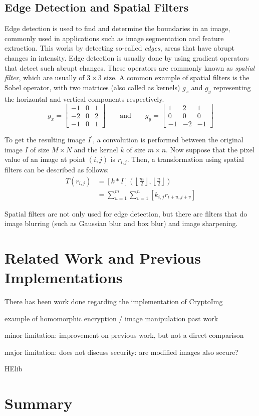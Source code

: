 \subsection{Edge Detection and Spatial Filters}
Edge detection is used to find and determine the boundaries in an image, commonly used in applications such as image segmentation and feature extraction. This works by detecting so-called \textit{edges}, areas that have abrupt changes in intensity. 
Edge detection is usually done by using gradient operators that detect such abrupt changes. These operators are commonly known as \textit{spatial filter}, which are usually of $3 \times 3$ size. A common example of spatial filters is the Sobel operator, with two matrices (also called as kernels) $g_x$ and $g_y$ representing the horizontal and vertical components respectively.
\begin{equation}
    g_x = 
    \begin{bmatrix}
        -1 & 0 & 1 \\
        -2 & 0 & 2 \\
        -1 & 0 & 1
    \end{bmatrix}
    \qquad\text{and}\qquad
    g_y = 
    \begin{bmatrix}
        1 & 2 & 1 \\
        0 & 0 & 0 \\
        -1 & -2 & -1
    \end{bmatrix}
\end{equation}

To get the resulting image $I^\prime$, a convolution is performed between the original image $I$ of size $M \times N$ and the kernel $k$ of size $m \times n$. Now suppose that the pixel value of an image at point $\left(i,j\right)$ is $r_{i,j}$. Then, a transformation using spatial filters can be described as follows:
\begin{align}
    T\left(r_{i,j}\right) &= \left[k * I\right]\left(\left\lfloor\frac{m}{2}\right\rfloor, \left\lfloor\frac{n}{2}\right\rfloor \right) \\
                         &= \sum_{u=1}^{m} \sum_{v=1}^{n} \left[k_{i,j} r_{i+u, j+v} \right]
\end{align}

Spatial filters are not only used for edge detection, but there are filters that do image blurring (such as Gaussian blur and box blur) and image sharpening.


\section{Related Work and Previous Implementations}
There has been work done regarding the implementation of 
CryptoImg

example of homomorphic encryption / image manipulation past work

minor limitation: improvement on previous work, but not a direct comparison

major limitation: does not discuss security: are modified images also secure?

HElib

\section{Summary}


